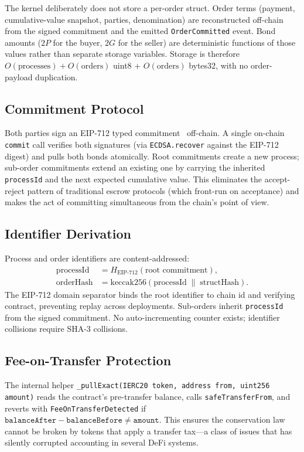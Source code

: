 \documentclass[11pt,a4paper]{article}
\theoremstyle{definition}
\theoremstyle{remark}
\newcommand{\pay}{P}
\newcommand{\cumval}{G}
\begin{document}
The kernel deliberately does not store a per-order struct. Order
terms (payment, cumulative-value snapshot, parties, denomination) are
reconstructed off-chain from the signed commitment and the emitted
\texttt{OrderCommitted} event. Bond amounts ($2\pay$ for the buyer,
$2\cumval$ for the seller) are deterministic functions of those
values rather than separate storage variables. Storage is therefore
$O(\text{processes}) + O(\text{orders})$ uint8 + $O(\text{orders})$
bytes32, with no order-payload duplication.

\subsection{Commitment Protocol}

Both parties sign an EIP-712 typed commitment~\citep{eip712}
off-chain. A single on-chain \texttt{commit} call verifies both
signatures (via \texttt{ECDSA.recover} against the EIP-712 digest)
and pulls both bonds atomically. Root commitments create a new
process; sub-order commitments extend an existing one by carrying
the inherited \texttt{processId} and the next expected cumulative
value. This eliminates the accept-reject pattern of traditional
escrow protocols (which front-run on acceptance) and makes the act
of committing simultaneous from the chain's point of view.

\subsection{Identifier Derivation}

Process and order identifiers are content-addressed:
\begin{align}
  \text{processId} &= H_{\text{EIP-712}}(\text{root commitment}), \\
  \text{orderHash} &= \mathrm{keccak256}(\text{processId} \;\|\; \text{structHash}).
\end{align}
The EIP-712 domain separator binds the root identifier to chain id
and verifying contract, preventing replay across deployments. Sub-orders
inherit \texttt{processId} from the signed commitment. No
auto-incrementing counter exists; identifier collisions require
SHA-3 collisions.

\subsection{Fee-on-Transfer Protection}

The internal helper \texttt{\_pullExact(IERC20 token, address from,
uint256 amount)} reads the contract's pre-transfer balance, calls
\texttt{safeTransferFrom}, and reverts with
\texttt{FeeOnTransferDetected} if
$\texttt{balanceAfter} - \texttt{balanceBefore} \neq
\texttt{amount}$. This ensures the conservation law cannot be broken
by tokens that apply a transfer tax---a class of issues that has
silently corrupted accounting in several DeFi systems.
\end{document}

